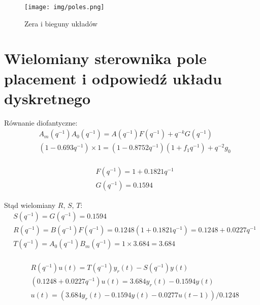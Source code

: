 \documentclass[fleqn]{article}
\newcommand \A {1 - 0.8752 q^{-1}}
\newcommand \B {0.1248}
\newcommand \Am {1 - 0.693 q^{-1}}
\newcommand \Bm {3.684}
\newcommand \aOne {-0.8752}
\newcommand \amOne {-0.693}
\newcommand \G {0.1594}
\newcommand \F {1 + 0.1821 q^{-1}}
\newcommand \R {\B + 0.0227 q^{-1}}
\begin{document}
\begin{figure}[H]
    \centering
    \texttt{[image: img/poles.png]}
    \caption{Zera i bieguny układów}
    \label{fig:Poles}
\end{figure}


\section{Wielomiany sterownika pole placement i odpowiedź układu dyskretnego}

Równanie diofantyczne: 
\begin{equation}\label{eq:dioph}
\begin{split}
& A_m(q^{-1}) A_0(q^{-1}) = A(q^{-1}) F(q^{-1}) + q^{-k} G(q^{-1}) \\
& (\Am) \times 1 = (\A) (1 + f_1 q^{-1}) + q^{-2} g_0 \\
\end{split}
\end{equation}

\begin{equation}\label{eq:dioph_sol}
\begin{split}
& F(q^{-1}) = \F \\
& G(q^{-1}) = \G
\end{split}
\end{equation}

Stąd wielomiany $R$, $S$, $T$:
\begin{equation}\label{eq:polynomials}
\begin{split}
& S(q^{-1}) = G(q^{-1}) = \G \\
& R(q^{-1}) = B(q^{-1})F(q^{-1}) = \B (\F) = \R \\
& T(q^{-1}) = A_0(q^{-1})B_m(q^{-1}) = 1 \times \Bm = \Bm \\
\end{split}
\end{equation}


\begin{equation}\label{eq:contr_signal}
\begin{split}
& R(q^{-1}) u(t) = T(q^{-1}) y_r(t) - S(q^{-1}) y(t) \\
& (\R) u(t) = \Bm y_r(t) - \G y(t) \\
& u(t) = ( \Bm y_r(t) - \G y(t) - 0.0277 u(t-1) ) / 0.1248
\end{split}
\end{equation}
\end{document}
